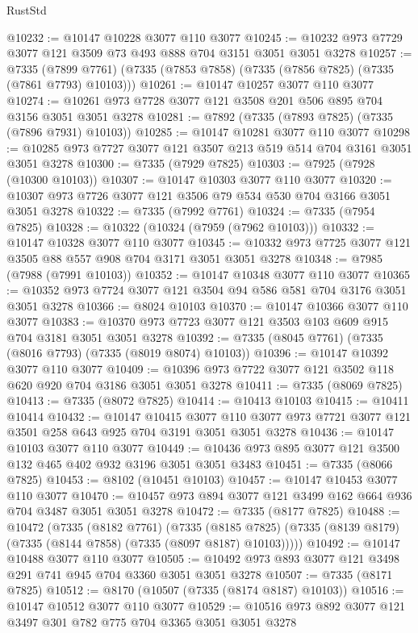 \begin{lexlean}{RustStd}
\begin{coremodule}
@10232 := @10147 @10228 @3077 @110 @3077
@10245 := @10232 @973 @7729 @3077 @121 @3509 @73 @493 @888 @704 @3151 @3051 @3051 @3278
@10257 := @7335
    (@7899 @7761)
    (@7335 (@7853 @7858) (@7335 (@7856 @7825) (@7335 (@7861 @7793) @10103)))
@10261 := @10147 @10257 @3077 @110 @3077
@10274 := @10261 @973 @7728 @3077 @121 @3508 @201 @506 @895 @704 @3156 @3051 @3051 @3278
@10281 := @7892 (@7335 (@7893 @7825) (@7335 (@7896 @7931) @10103))
@10285 := @10147 @10281 @3077 @110 @3077
@10298 := @10285 @973 @7727 @3077 @121 @3507 @213 @519 @514 @704 @3161 @3051 @3051 @3278
@10300 := @7335 (@7929 @7825)
@10303 := @7925 (@7928 (@10300 @10103))
@10307 := @10147 @10303 @3077 @110 @3077
@10320 := @10307 @973 @7726 @3077 @121 @3506 @79 @534 @530 @704 @3166 @3051 @3051 @3278
@10322 := @7335 (@7992 @7761)
@10324 := @7335 (@7954 @7825)
@10328 := @10322 (@10324 (@7959 (@7962 @10103)))
@10332 := @10147 @10328 @3077 @110 @3077
@10345 := @10332 @973 @7725 @3077 @121 @3505 @88 @557 @908 @704 @3171 @3051 @3051 @3278
@10348 := @7985 (@7988 (@7991 @10103))
@10352 := @10147 @10348 @3077 @110 @3077
@10365 := @10352 @973 @7724 @3077 @121 @3504 @94 @586 @581 @704 @3176 @3051 @3051 @3278
@10366 := @8024 @10103
@10370 := @10147 @10366 @3077 @110 @3077
@10383 := @10370 @973 @7723 @3077 @121 @3503 @103 @609 @915 @704 @3181 @3051 @3051 @3278
@10392 := @7335 (@8045 @7761) (@7335 (@8016 @7793) (@7335 (@8019 @8074) @10103))
@10396 := @10147 @10392 @3077 @110 @3077
@10409 := @10396 @973 @7722 @3077 @121 @3502 @118 @620 @920 @704 @3186 @3051 @3051 @3278
@10411 := @7335 (@8069 @7825)
@10413 := @7335 (@8072 @7825)
@10414 := @10413 @10103
@10415 := @10411 @10414
@10432 := @10147
    @10415
    @3077
    @110
    @3077
    @973
    @7721
    @3077
    @121
    @3501
    @258
    @643
    @925
    @704
    @3191
    @3051
    @3051
    @3278
@10436 := @10147 @10103 @3077 @110 @3077
@10449 := @10436 @973 @895 @3077 @121 @3500 @132 @465 @402 @932 @3196 @3051 @3051 @3483
@10451 := @7335 (@8066 @7825)
@10453 := @8102 (@10451 @10103)
@10457 := @10147 @10453 @3077 @110 @3077
@10470 := @10457 @973 @894 @3077 @121 @3499 @162 @664 @936 @704 @3487 @3051 @3051 @3278
@10472 := @7335 (@8177 @7825)
@10488 := @10472
    (@7335
      (@8182 @7761)
      (@7335
        (@8185 @7825)
        (@7335 (@8139 @8179) (@7335 (@8144 @7858) (@7335 (@8097 @8187) @10103)))))
@10492 := @10147 @10488 @3077 @110 @3077
@10505 := @10492 @973 @893 @3077 @121 @3498 @291 @741 @945 @704 @3360 @3051 @3051 @3278
@10507 := @7335 (@8171 @7825)
@10512 := @8170 (@10507 (@7335 (@8174 @8187) @10103))
@10516 := @10147 @10512 @3077 @110 @3077
@10529 := @10516 @973 @892 @3077 @121 @3497 @301 @782 @775 @704 @3365 @3051 @3051 @3278

\end{coremodule}
\end{lexlean}
